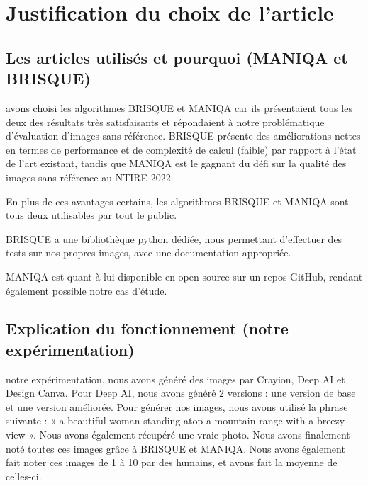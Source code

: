 \documentclass{ieeeaccess}
\begin{document}
\section{Justification du choix de l'article}

\subsection{Les articles utilisés et pourquoi (MANIQA et BRISQUE)}

 avons choisi les algorithmes BRISQUE et MANIQA car ils présentaient tous les deux des résultats très satisfaisants et répondaient à notre problématique d’évaluation d’images sans référence. BRISQUE présente des améliorations nettes en termes de performance et de complexité de calcul (faible) par rapport à l’état de l’art existant, tandis que MANIQA est le gagnant du défi sur la qualité des images sans référence au NTIRE 2022.  

En plus de ces avantages certains, les algorithmes BRISQUE et MANIQA sont tous deux utilisables par tout le public.  

BRISQUE a une bibliothèque python dédiée, nous permettant d’effectuer des tests sur nos propres images, avec une documentation appropriée. 

MANIQA est quant à lui disponible en open source sur un repos GitHub, rendant également possible notre cas d’étude.   

\subsection{Explication du fonctionnement (notre expérimentation)}

 notre expérimentation, nous avons généré des images par Crayion, Deep AI et Design Canva. Pour Deep AI, nous avons généré 2 versions : une version de base et une version améliorée. Pour générer nos images, nous avons utilisé la phrase suivante : « a beautiful woman standing atop a mountain range with a breezy view ». Nous avons également récupéré une vraie photo. Nous avons finalement noté toutes ces images grâce à BRISQUE et MANIQA. Nous avons également fait noter ces images de 1 à 10 par des humains, et avons fait la moyenne de celles-ci.
\newline
\newline
\newline
\newline
\newline
\newline
\end{document}
